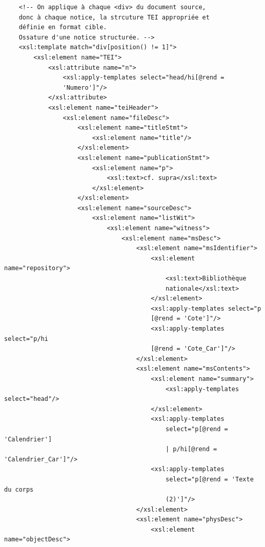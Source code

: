 \documentclass[a4paper,12pt,twoside]{book}
\begin{document}
\begin{verbatim}
    <!-- On applique à chaque <div> du document source, 
    donc à chaque notice, la strcuture TEI appropriée et 
    définie en format cible. 
    Ossature d'une notice structurée. -->
    <xsl:template match="div[position() != 1]">
        <xsl:element name="TEI">
            <xsl:attribute name="n">
                <xsl:apply-templates select="head/hi[@rend = 
                'Numero']"/>
            </xsl:attribute>
            <xsl:element name="teiHeader">
                <xsl:element name="fileDesc">
                    <xsl:element name="titleStmt">
                        <xsl:element name="title"/>
                    </xsl:element>
                    <xsl:element name="publicationStmt">
                        <xsl:element name="p">
                            <xsl:text>cf. supra</xsl:text>
                        </xsl:element>
                    </xsl:element>
                    <xsl:element name="sourceDesc">
                        <xsl:element name="listWit">
                            <xsl:element name="witness">
                                <xsl:element name="msDesc">
                                    <xsl:element name="msIdentifier">
                                        <xsl:element name="repository">
                                            <xsl:text>Bibliothèque 
                                            nationale</xsl:text>
                                        </xsl:element>
                                        <xsl:apply-templates select="p
                                        [@rend = 'Cote']"/>
                                        <xsl:apply-templates select="p/hi
                                        [@rend = 'Cote_Car']"/>
                                    </xsl:element>
                                    <xsl:element name="msContents">
                                        <xsl:element name="summary">
                                            <xsl:apply-templates select="head"/>
                                        </xsl:element>
                                        <xsl:apply-templates
                                            select="p[@rend = 'Calendrier'] 
                                            | p/hi[@rend = 'Calendrier_Car']"/>
                                        <xsl:apply-templates
                                            select="p[@rend = 'Texte du corps 
                                            (2)']"/>
                                    </xsl:element>
                                    <xsl:element name="physDesc">
                                        <xsl:element name="objectDesc">

\end{verbatim}
\end{document}
